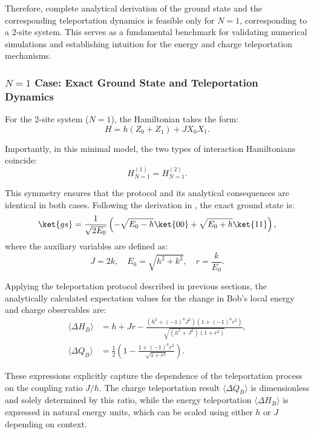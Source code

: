 Therefore, complete analytical derivation of the ground state and the corresponding teleportation dynamics is feasible only for \( N = 1 \), corresponding to a 2-site system. This serves as a fundamental benchmark for validating numerical simulations and establishing intuition for the energy and charge teleportation mechanisms.

\subsubsection{\texorpdfstring{$N = 1$}{N1} Case: Exact Ground State and Teleportation Dynamics}

For the 2-site system (\( N = 1 \)), the Hamiltonian takes the form:
\begin{equation}
    H = h(Z_0 + Z_1) + J X_0 X_1.
\end{equation}

Importantly, in this minimal model, the two types of interaction Hamiltonians coincide:
\begin{equation*}
    H^{(1)}_{N=1} = H^{(2)}_{N=1}.
\end{equation*}

This symmetry ensures that the protocol and its analytical consequences are identical in both cases. Following the derivation in \cite{Hotta2011,Ikeda2023}, the exact ground state is:
\begin{equation}
    \ket{gs} = \frac{1}{\sqrt{2E_0}} \left( -\sqrt{E_0 - h} \ket{00} + \sqrt{E_0 + h} \ket{11} \right),
\end{equation}
where the auxiliary variables are defined as:
\begin{equation}
    J = 2k, \quad E_0 = \sqrt{h^2 + k^2}, \quad r = \frac{k}{E_0}.
\end{equation}

Applying the teleportation protocol described in previous sections, the analytically calculated expectation values for the change in Bob’s local energy and charge observables are:
\begin{align}
    \langle \Delta H_B \rangle &= h + Jr - \frac{ \left( h^2 + (-1)^a J^2 \right) \left( 1 + (-1)^a r^2 \right) }{ \sqrt{ (h^2 + J^2)(1 + r^2) } }, \\
    \langle \Delta Q_B \rangle &= \frac{1}{2} \left( 1 - \frac{ 1 + (-1)^a r^2 }{ \sqrt{1 + r^2} } \right).
\end{align}

These expressions explicitly capture the dependence of the teleportation process on the coupling ratio \( J/h \). The charge teleportation result \( \langle \Delta Q_B \rangle \) is dimensionless and solely determined by this ratio, while the energy teleportation \( \langle \Delta H_B \rangle \) is expressed in natural energy units, which can be scaled using either \( h \) or \( J \) depending on context.

